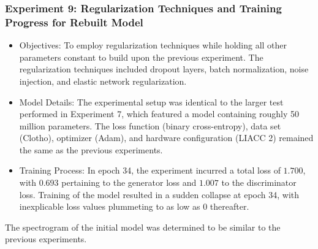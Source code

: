 \begin{frame}
    \frametitle{Experiment 9: Regularization Techniques and Training Progress for Rebuilt Model}

    \begin{itemize}
        \item Objectives: To employ regularization techniques while holding all other parameters constant to build upon the previous experiment. The regularization techniques included dropout layers, batch normalization, noise injection, and elastic network regularization.
        \item Model Details: The experimental setup was identical to the larger test performed in Experiment 7, which featured a model containing roughly 50 million parameters. The loss function (binary cross-entropy), data set (Clotho), optimizer (Adam), and hardware configuration (LIACC 2) remained the same as the previous experiments.
        \item Training Process: In epoch 34, the experiment incurred a total loss of $1.700$, with $0.693$ pertaining to the generator loss and $1.007$ to the discriminator loss. Training of the model resulted in a sudden collapse at epoch 34, with inexplicable loss values plummeting to as low as 0 thereafter.
    \end{itemize}

    The spectrogram of the initial model was determined to be similar to the previous experiments.
\end{frame}

